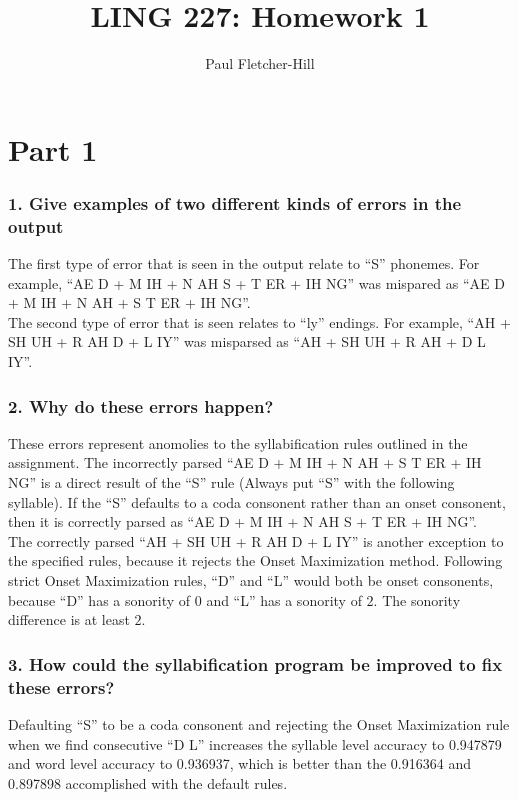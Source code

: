 \documentclass[a4paper,10pt]{article}
\newcommand{\br}{\\[10pt]}
\begin{document}
  \title{LING 227: Homework 1}
  \author{Paul Fletcher-Hill}
  \maketitle


  \section*{Part 1}
  \subsubsection*{1. Give examples of two different kinds of errors in the output}
  The first type of error that is seen in the output relate to ``S'' phonemes. For example, ``AE D + M IH + N AH S + T ER + IH NG'' was mispared as ``AE D + M IH + N AH + S T ER + IH NG''.
  \br
  The second type of error that is seen relates to ``ly'' endings. For example, ``AH + SH UH + R AH D + L IY'' was misparsed as ``AH + SH UH + R AH + D L IY''.

  \subsubsection*{2. Why do these errors happen?}
  These errors represent anomolies to the syllabification rules outlined in the assignment. The incorrectly parsed ``AE D + M IH + N AH + S T ER + IH NG'' is a direct result of the ``S'' rule (Always put ``S'' with the following syllable). If the ``S'' defaults to a coda consonent rather than an onset consonent, then it is correctly parsed as ``AE D + M IH + N AH S + T ER + IH NG''. 
  \br
  The correctly parsed ``AH + SH UH + R AH D + L IY'' is another exception to the specified rules, because it rejects the Onset Maximization method. Following strict Onset Maximization rules, ``D'' and ``L'' would both be onset consonents, because ``D'' has a sonority of $0$ and ``L'' has a sonority of $2$. The sonority difference is at least $2$.


  \subsubsection*{3. How could the syllabification program be improved to fix these errors?}
  Defaulting ``S'' to be a coda consonent and rejecting the Onset Maximization rule when we find consecutive ``D L'' increases the syllable level accuracy to 0.947879 and word level accuracy to 0.936937, which is better than the 0.916364 and 0.897898 accomplished with the default rules.
  
\end{document}
